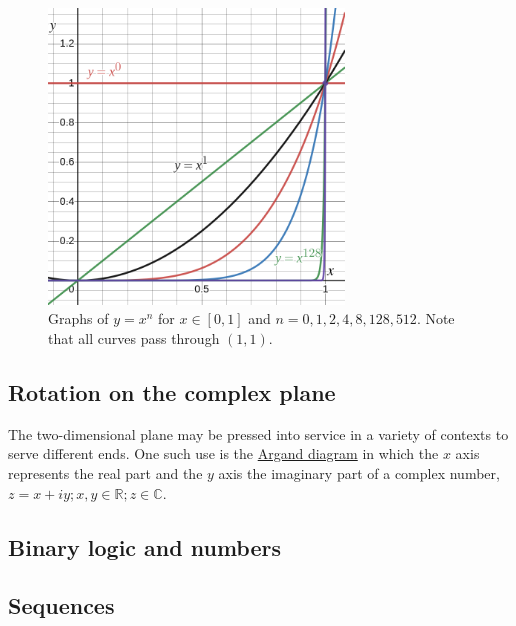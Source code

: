 \documentclass[
  a4paper,
]{article}
\begin{document}
\begin{figure}
\hypertarget{fig:x-to-n}{%
\centering
\includegraphics[width=0.7\textwidth,height=\textheight]{images/y-equals-x-to-the-n-in-0-1.png}
\caption{Graphs of \(y = x^n\) for \(x \in [0, 1]\) and
\(n = 0, 1, 2, 4, 8, 128, 512\). Note that all curves pass through
\((1, 1)\).}\label{fig:x-to-n}
}
\end{figure}

\hypertarget{rotation-on-the-complex-plane}{%
\subsection{Rotation on the complex
plane}\label{rotation-on-the-complex-plane}}

The two-dimensional plane may be pressed into service in a variety of
contexts to serve different ends. One such use is the
\href{https://mathworld.wolfram.com/ArgandDiagram.html}{Argand diagram}
in which the \(x\) axis represents the real part and the \(y\) axis the
imaginary part of a complex number,
\(z = x + iy; x, y \in \mathbb{R}; z \in \mathbb{C}\).

\hypertarget{binary-logic-and-numbers}{%
\subsection{Binary logic and numbers}\label{binary-logic-and-numbers}}

\hypertarget{sequences}{%
\subsection{Sequences}\label{sequences}}
\end{document}
